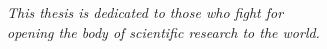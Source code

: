 
\clearpage
\vfill

{
\noindent%
\raggedleft%
\emph{%
This thesis is dedicated to those who fight for\\
opening the body of scientific research to the world.
}\\
}

\vfill